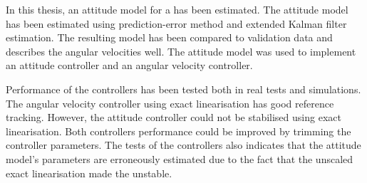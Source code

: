In this thesis, an attitude model for a \abbrROV has been estimated. The attitude model has been estimated using prediction-error method and extended Kalman filter estimation. The resulting model has been compared to validation data and describes the angular velocities well. The attitude model was used to implement an attitude controller and an angular velocity controller. 

Performance of the controllers has been tested both in real tests and simulations. The angular velocity controller using exact linearisation has good reference tracking. However, the attitude controller could not be stabilised using exact linearisation. Both controllers performance could be improved by trimming the controller parameters. 
The tests of the controllers also indicates that the attitude model's parameters are erroneously estimated due to the fact that the unscaled exact linearisation made the \abbrROV unstable.